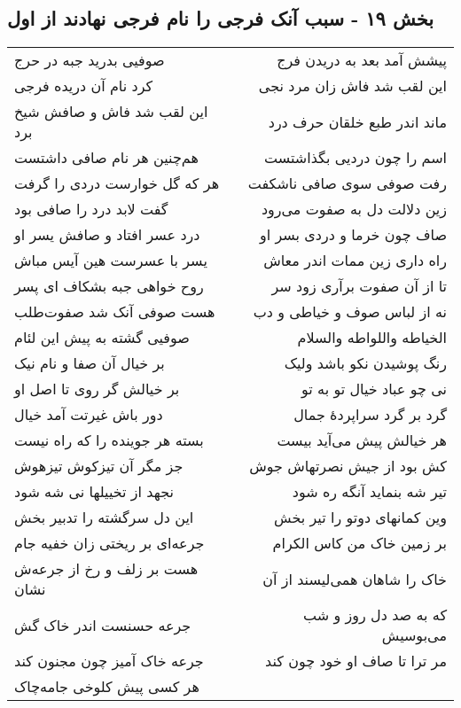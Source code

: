 \begin{center}
\section*{بخش ۱۹ - سبب آنک فرجی را نام فرجی نهادند از اول}
\label{sec:sh019}
\begin{longtable}{l p{0.5cm} r}
صوفیی بدرید جبه در حرج
&&
پیشش آمد بعد به دریدن فرج
\\
کرد نام آن دریده فرجی
&&
این لقب شد فاش زان مرد نجی
\\
این لقب شد فاش و صافش شیخ برد
&&
ماند اندر طبع خلقان حرف درد
\\
هم‌چنین هر نام صافی داشتست
&&
اسم را چون دردیی بگذاشتست
\\
هر که گل خوارست دردی را گرفت
&&
رفت صوفی سوی صافی ناشکفت
\\
گفت لابد درد را صافی بود
&&
زین دلالت دل به صفوت می‌رود
\\
درد عسر افتاد و صافش یسر او
&&
صاف چون خرما و دردی بسر او
\\
یسر با عسرست هین آیس مباش
&&
راه داری زین ممات اندر معاش
\\
روح خواهی جبه بشکاف ای پسر
&&
تا از آن صفوت برآری زود سر
\\
هست صوفی آنک شد صفوت‌طلب
&&
نه از لباس صوف و خیاطی و دب
\\
صوفیی گشته به پیش این لئام
&&
الخیاطه واللواطه والسلام
\\
بر خیال آن صفا و نام نیک
&&
رنگ پوشیدن نکو باشد ولیک
\\
بر خیالش گر روی تا اصل او
&&
نی چو عباد خیال تو به تو
\\
دور باش غیرتت آمد خیال
&&
گرد بر گرد سراپردهٔ جمال
\\
بسته هر جوینده را که راه نیست
&&
هر خیالش پیش می‌آید بیست
\\
جز مگر آن تیزکوش تیزهوش
&&
کش بود از جیش نصرتهاش جوش
\\
نجهد از تخییلها نی شه شود
&&
تیر شه بنماید آنگه ره شود
\\
این دل سرگشته را تدبیر بخش
&&
وین کمانهای دوتو را تیر بخش
\\
جرعه‌ای بر ریختی زان خفیه جام
&&
بر زمین خاک من کاس الکرام
\\
هست بر زلف و رخ از جرعه‌ش نشان
&&
خاک را شاهان همی‌لیسند از آن
\\
جرعه حسنست اندر خاک گش
&&
که به صد دل روز و شب می‌بوسیش
\\
جرعه خاک آمیز چون مجنون کند
&&
مر ترا تا صاف او خود چون کند
\\
هر کسی پیش کلوخی جامه‌چاک

\end{longtable}
\end{center}

